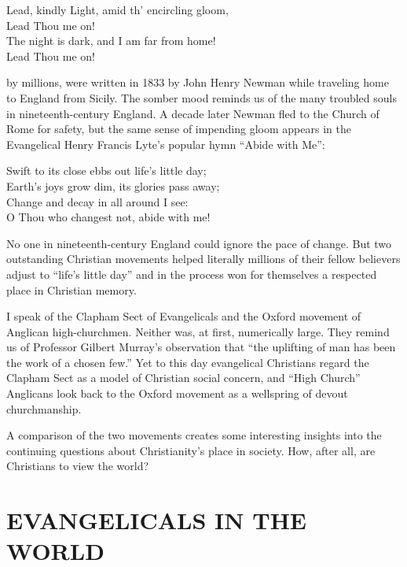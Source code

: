 
\begin{poem}
Lead, kindly Light, amid th’ encircling gloom,\\
Lead Thou me on!\\
The night is dark, and I am far from home!\\
Lead Thou me on!
\end{poem}

 by millions, were written in 1833 by John Henry Newman while
traveling home to England from Sicily. The somber mood reminds us of the many troubled souls in
nineteenth-century England. A decade later Newman fled to the Church of Rome for safety, but the
same sense of impending gloom appears in the Evangelical Henry Francis Lyte’s popular hymn “Abide
with Me”:

\begin{poem}
Swift to its close ebbs out life’s little day;\\
Earth’s joys grow dim, its glories pass away;\\
Change and decay in all around I see:\\
O Thou who changest not, abide with me!
\end{poem}

No one in nineteenth-century England could ignore the pace of change. But two outstanding Christian
movements helped literally millions of their fellow believers adjust to “life’s little day” and in
the process won for themselves a respected place in Christian memory.

I speak of the Clapham Sect of Evangelicals and the Oxford movement of Anglican high-churchmen.
Neither was, at first, numerically large. They remind us of Professor Gilbert Murray’s observation
that “the uplifting of man has been the work of a chosen few.” Yet to this day evangelical
Christians regard the Clapham Sect as a model of Christian social concern, and “High Church”
Anglicans look back to the Oxford movement as a wellspring of devout churchmanship.

A comparison of the two movements creates some interesting insights into the continuing questions
about Christianity’s place in society. How, after all, are Christians to view the world?

\section{EVANGELICALS IN THE WORLD}

